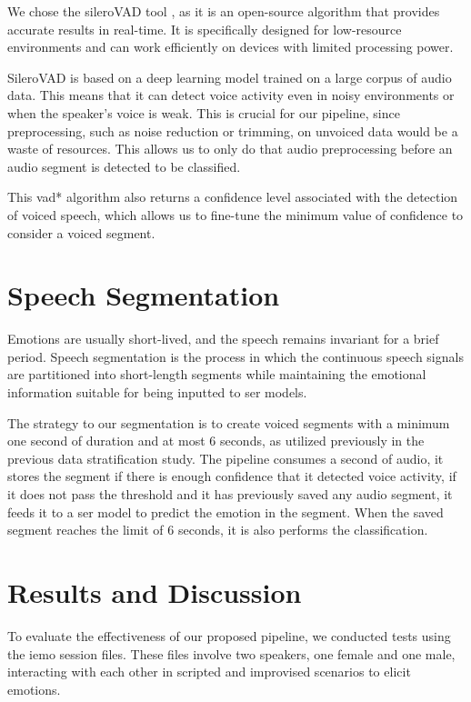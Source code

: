 We chose the sileroVAD tool \cite{SileroVAD}, as it is an open-source algorithm that provides accurate results in real-time. It is specifically designed for low-resource environments and can work efficiently on devices with limited processing power.

SileroVAD is based on a deep learning model trained on a large corpus of audio data. This means that it can detect voice activity even in noisy environments or when the speaker's voice is weak. This is crucial for our pipeline, since preprocessing, such as noise reduction or trimming, on unvoiced data would be a waste of resources. This allows us to only do that audio preprocessing before an audio segment is detected to be classified.

This \ac{vad*} algorithm also returns a confidence level associated with the detection of voiced speech, which allows us to fine-tune the minimum value of confidence to consider a voiced segment.

\section{Speech Segmentation}

Emotions are usually short-lived, and the speech remains invariant for a brief period. Speech segmentation is the process in which the continuous speech signals are partitioned into short-length segments while maintaining the emotional information suitable for being inputted to \ac{ser} models.

The strategy to our segmentation is to create voiced segments with a minimum one second of duration and at most 6 seconds, as utilized previously in the previous data stratification study. The pipeline consumes a second of audio, it stores the segment if there is enough confidence that it detected voice activity, if it does not pass the threshold and it has previously saved any audio segment, it feeds it to a \ac{ser} model to predict the emotion in the segment. When the saved segment reaches the limit of 6 seconds, it is also performs the classification.


\section{Results and Discussion}

To evaluate the effectiveness of our proposed pipeline, we conducted tests using the \ac{iemo} session files. These files involve two speakers, one female and one male, interacting with each other in scripted and improvised scenarios to elicit emotions.

